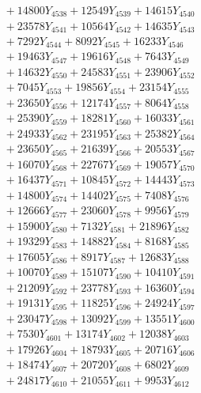 \documentclass[a4paper,10pt]{article}
\begin{document}
{\begin{align}
&\;  + 14800 Y_{4538} + 12549 Y_{4539} + 14615 Y_{4540} \\[0.3ex]
&\;  + 23578 Y_{4541} + 10564 Y_{4542} + 14635 Y_{4543} \\[0.3ex]
&\;  + 7292 Y_{4544} + 8092 Y_{4545} + 16233 Y_{4546} \\[0.3ex]
&\;  + 19463 Y_{4547} + 19616 Y_{4548} + 7643 Y_{4549} \\[0.3ex]
&\;  + 14632 Y_{4550} + 24583 Y_{4551} + 23906 Y_{4552} \\[0.3ex]
&\;  + 7045 Y_{4553} + 19856 Y_{4554} + 23154 Y_{4555} \\[0.3ex]
&\;  + 23650 Y_{4556} + 12174 Y_{4557} + 8064 Y_{4558} \\[0.5ex]\allowbreak
&\;  + 25390 Y_{4559} + 18281 Y_{4560} + 16033 Y_{4561} \\[0.3ex]
&\;  + 24933 Y_{4562} + 23195 Y_{4563} + 25382 Y_{4564} \\[0.3ex]
&\;  + 23650 Y_{4565} + 21639 Y_{4566} + 20553 Y_{4567} \\[0.3ex]
&\;  + 16070 Y_{4568} + 22767 Y_{4569} + 19057 Y_{4570} \\[0.3ex]
&\;  + 16437 Y_{4571} + 10845 Y_{4572} + 14443 Y_{4573} \\[0.3ex]
&\;  + 14800 Y_{4574} + 14402 Y_{4575} + 7408 Y_{4576} \\[0.3ex]
&\;  + 12666 Y_{4577} + 23060 Y_{4578} + 9956 Y_{4579} \\[0.3ex]
&\;  + 15900 Y_{4580} + 7132 Y_{4581} + 21896 Y_{4582} \\[0.3ex]
&\;  + 19329 Y_{4583} + 14882 Y_{4584} + 8168 Y_{4585} \\[0.3ex]
&\;  + 17605 Y_{4586} + 8917 Y_{4587} + 12683 Y_{4588} \\[0.5ex]\allowbreak
&\;  + 10070 Y_{4589} + 15107 Y_{4590} + 10410 Y_{4591} \\[0.3ex]
&\;  + 21209 Y_{4592} + 23778 Y_{4593} + 16360 Y_{4594} \\[0.3ex]
&\;  + 19131 Y_{4595} + 11825 Y_{4596} + 24924 Y_{4597} \\[0.3ex]
&\;  + 23047 Y_{4598} + 13092 Y_{4599} + 13551 Y_{4600} \\[0.3ex]
&\;  + 7530 Y_{4601} + 13174 Y_{4602} + 12038 Y_{4603} \\[0.3ex]
&\;  + 17926 Y_{4604} + 18793 Y_{4605} + 20716 Y_{4606} \\[0.3ex]
&\;  + 18474 Y_{4607} + 20720 Y_{4608} + 6802 Y_{4609} \\[0.3ex]
&\;  + 24817 Y_{4610} + 21055 Y_{4611} + 9953 Y_{4612} \\[0.3ex]

\end{align}}
\end{document}
